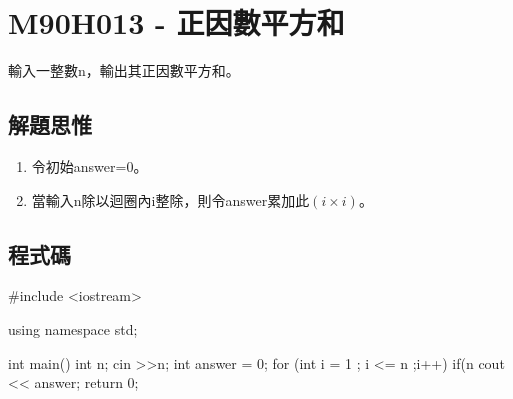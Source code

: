 \section{M90H013 - 正因數平方和}
輸入一整數n，輸出其正因數平方和。
\subsection{解題思惟}
\begin{enumerate}
	\item 令初始answer=0。
	\item 當輸入n除以迴圈內i整除，則令answer累加此$(i\times i)$。
\end{enumerate}
\subsection{程式碼}
\begin{cppcode}
#include <iostream>

using namespace std;

int main()
{
	int n;
	cin >>n;
	int answer = 0;
	for (int i = 1 ; i <= n ;i++) {
		if(n %
	}
	cout << answer;
	return 0;
}
\end{cppcode}
